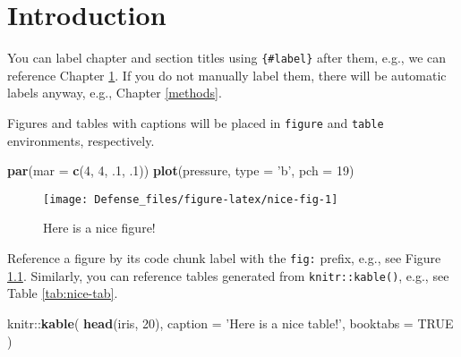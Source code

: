 \documentclass[]{book}
\newenvironment{Shaded}{\begin{snugshade}}{\end{snugshade}}
\newcommand{\KeywordTok}[1]{\textcolor[rgb]{0.13,0.29,0.53}{\textbf{{#1}}}}
\newcommand{\DataTypeTok}[1]{\textcolor[rgb]{0.13,0.29,0.53}{{#1}}}
\newcommand{\DecValTok}[1]{\textcolor[rgb]{0.00,0.00,0.81}{{#1}}}
\newcommand{\StringTok}[1]{\textcolor[rgb]{0.31,0.60,0.02}{{#1}}}
\newcommand{\OtherTok}[1]{\textcolor[rgb]{0.56,0.35,0.01}{{#1}}}
\newcommand{\NormalTok}[1]{{#1}}
\theoremstyle{definition}
\theoremstyle{definition}
\theoremstyle{remark}
\begin{document}
\chapter{Introduction}\label{intro}

You can label chapter and section titles using \texttt{\{\#label\}}
after them, e.g., we can reference Chapter \ref{intro}. If you do not
manually label them, there will be automatic labels anyway, e.g.,
Chapter \ref{methods}.

Figures and tables with captions will be placed in \texttt{figure} and
\texttt{table} environments, respectively.

\begin{Shaded}
\begin{Highlighting}[]
\KeywordTok{par}\NormalTok{(}\DataTypeTok{mar =} \KeywordTok{c}\NormalTok{(}\DecValTok{4}\NormalTok{, }\DecValTok{4}\NormalTok{, .}\DecValTok{1}\NormalTok{, .}\DecValTok{1}\NormalTok{))}
\KeywordTok{plot}\NormalTok{(pressure, }\DataTypeTok{type =} \StringTok{'b'}\NormalTok{, }\DataTypeTok{pch =} \DecValTok{19}\NormalTok{)}
\end{Highlighting}
\end{Shaded}

\begin{figure}

{\centering \texttt{[image: Defense\_files/figure-latex/nice-fig-1]} 

}

\caption{Here is a nice figure!}\label{fig:nice-fig}
\end{figure}

Reference a figure by its code chunk label with the \texttt{fig:}
prefix, e.g., see Figure \ref{fig:nice-fig}. Similarly, you can
reference tables generated from \texttt{knitr::kable()}, e.g., see Table
\ref{tab:nice-tab}.

\begin{Shaded}
\begin{Highlighting}[]
\NormalTok{knitr::}\KeywordTok{kable}\NormalTok{(}
  \KeywordTok{head}\NormalTok{(iris, }\DecValTok{20}\NormalTok{), }\DataTypeTok{caption =} \StringTok{'Here is a nice table!'}\NormalTok{,}
  \DataTypeTok{booktabs =} \OtherTok{TRUE}
\NormalTok{)}
\end{Highlighting}
\end{Shaded}
\end{document}
